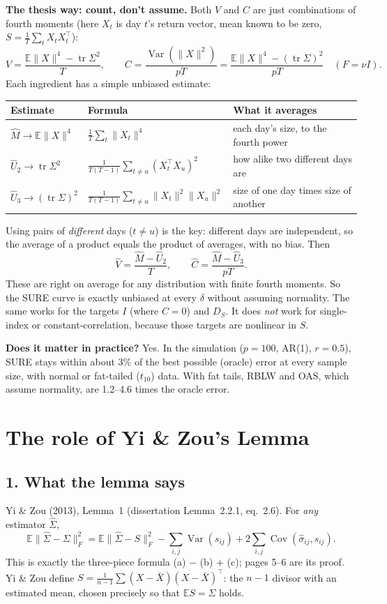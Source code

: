 \documentclass[12pt]{article}
\begin{document}
\textbf{The thesis way: count, don't assume.} Both $V$ and $C$ are just combinations of fourth moments
(here $X_t$ is day $t$'s return vector, mean known to be zero, $S=\frac1T\sum_tX_tX_t^\top$):
\[
V=\frac{\mathbb{E}\|X\|^4-\operatorname{tr}\Sigma^2}{T},\qquad
C=\frac{\operatorname{Var}(\|X\|^2)}{pT}=\frac{\mathbb{E}\|X\|^4-(\operatorname{tr}\Sigma)^2}{pT}\quad(F=\nu I).
\]
Each ingredient has a simple unbiased estimate:
\begin{center}
\begin{tabular}{@{}lll@{}}
\toprule
Estimate & Formula & What it averages \\
\midrule
$\hat M\to\mathbb{E}\|X\|^4$ & $\frac1T\sum_t\|X_t\|^4$ & each day's size, to the fourth power \\
$\hat U_2\to\operatorname{tr}\Sigma^2$ & $\frac{1}{T(T-1)}\sum_{t\neq u}(X_t^\top X_u)^2$ & how alike two different days are \\
$\hat U_3\to(\operatorname{tr}\Sigma)^2$ & $\frac{1}{T(T-1)}\sum_{t\neq u}\|X_t\|^2\|X_u\|^2$ & size of one day times size of another \\
\bottomrule
\end{tabular}
\end{center}
Using pairs of \emph{different} days ($t\neq u$) is the key: different days are independent, so the
average of a product equals the product of averages, with no bias. Then
\[
\hat V=\frac{\hat M-\hat U_2}{T},\qquad \hat C=\frac{\hat M-\hat U_3}{pT}.
\]
These are right on average for any distribution with finite fourth moments. So the SURE curve is
exactly unbiased at every $\delta$ without assuming normality. The same works for the targets $I$
(where $C=0$) and $D_S$. It does \emph{not} work for single-index or constant-correlation, because
those targets are nonlinear in $S$.

\textbf{Does it matter in practice?} Yes. In the simulation ($p=100$, AR(1), $r=0.5$), SURE stays within
about 3\% of the best possible (oracle) error at every sample size, with normal or fat-tailed ($t_{10}$)
data. With fat tails, RBLW and OAS, which assume normality, are 1.2--4.6 times the oracle error.

\newpage
\section*{The role of Yi \& Zou's Lemma}
\subsection*{1. What the lemma says}
Yi \& Zou (2013), Lemma~1 (dissertation Lemma~2.2.1, eq.~2.6). For \emph{any} estimator $\hat\Sigma$,
\[
\mathbb{E}\|\hat\Sigma-\Sigma\|_F^2=\mathbb{E}\|\hat\Sigma-S\|_F^2-\sum_{i,j}\operatorname{Var}(s_{ij})+2\sum_{i,j}\operatorname{Cov}(\hat\sigma_{ij},s_{ij}).
\]
This is exactly the three-piece formula (a) $-$ (b) $+$ (c); pages 5--6 are its proof. Yi \& Zou define
$S=\frac{1}{n-1}\sum(X-\bar X)(X-\bar X)^\top$: the $n-1$ divisor with an estimated mean, chosen precisely
so that $\mathbb{E}S=\Sigma$ holds.
\end{document}
